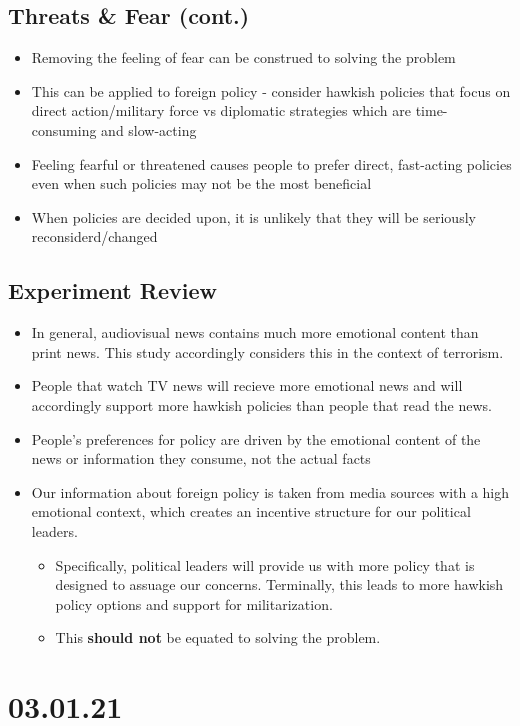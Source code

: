 \documentclass[11pt]{article}
\begin{document}
\subsection*{Threats \& Fear (cont.)}
\label{sec:orgfec9b39}
\begin{itemize}
\item Removing the feeling of fear can be construed to solving the problem
\item This can be applied to foreign policy - consider hawkish policies that focus on direct action/military force vs diplomatic strategies which are time-consuming and slow-acting
\item Feeling fearful or threatened causes people to prefer direct, fast-acting policies even when such policies may not be the most beneficial
\item When policies are decided upon, it is unlikely that they will be seriously reconsiderd/changed
\end{itemize}
\subsection*{Experiment Review}
\label{sec:orgc0ebe9b}
\begin{itemize}
\item In general, audiovisual news contains much more emotional content than print news. This study accordingly considers this in the context of terrorism.
\item People that watch TV news will recieve more emotional news and will accordingly support more hawkish policies than people that read the news.
\item People's preferences for policy are driven by the emotional content of the news or information they consume, not the actual facts
\item Our information about foreign policy is taken from media sources with a high emotional context, which creates an incentive structure for our political leaders.
\begin{itemize}
\item Specifically, political leaders will provide us with more policy that is designed to assuage our concerns. Terminally, this leads to more hawkish policy options and support for militarization.
\item This \textbf{should not} be equated to solving the problem.
\end{itemize}
\end{itemize}
\section*{03.01.21}
\label{sec:orgd278766}
\end{document}
